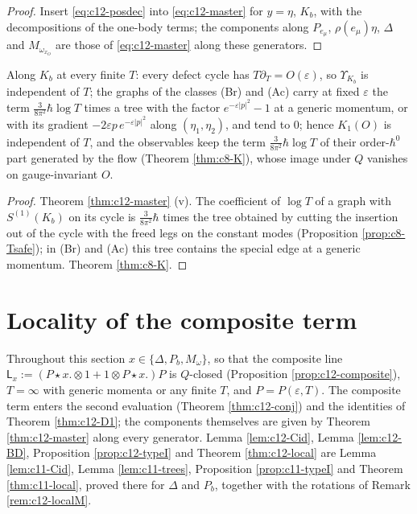\begin{proof}
Insert \eqref{eq:c12-posdec} into \eqref{eq:c12-master} for $y=\eta$, $K_b$, with the decompositions of the one-body terms; the components along $P_{e_\mu}$, $\rho(e_\mu)\eta$, $\Delta$ and $M_{\omega_{x_O}}$ are those of \eqref{eq:c12-master} along these generators.
\end{proof}

\begin{proposition}
\label{prop:c12-KT}
Along $K_b$ at every finite $T$: every defect cycle has $T\partial_T=O(\varepsilon)$, so $\Upsilon_{K_b}$ is independent of $T$; the graphs of the classes (Br) and (Ac) carry at fixed $\varepsilon$ the term $\tfrac3{8\pi^2}\hbar\log T$ times a tree with the factor $e^{-\varepsilon|p|^2}-1$ at a generic momentum, or with its gradient $-2\varepsilon p\,e^{-\varepsilon|p|^2}$ along $(\eta_1,\eta_2)$, and tend to $0$; hence $K_1(O)$ is independent of $T$, and the observables keep the term $\tfrac3{8\pi^2}\hbar\log T$ of their order-$\hbar^0$ part generated by the flow (Theorem \ref{thm:c8-K}), whose image under $Q$ vanishes on gauge-invariant $O$.
\end{proposition}

\begin{proof}
Theorem \ref{thm:c12-master} (v). The coefficient of $\log T$ of a graph with $S^{(1)}(K_b)$ on its cycle is $\tfrac3{8\pi^2}\hbar$ times the tree obtained by cutting the insertion out of the cycle with the freed legs on the constant modes (Proposition \ref{prop:c8-Tsafe}); in (Br) and (Ac) this tree contains the special edge at a generic momentum. Theorem \ref{thm:c8-K}.
\end{proof}

\section{Locality of the composite term}

Throughout this section $x\in\{\Delta,P_b,M_\omega\}$, so that the composite line $\mathsf L_x:=(P\star x.\otimes1+1\otimes P\star x.)P$ is $Q$-closed (Proposition \ref{prop:c12-composite}), $T=\infty$ with generic momenta or any finite $T$, and $P=P(\varepsilon,T)$. The composite term enters the second evaluation (Theorem \ref{thm:c12-conj}) and the identities of Theorem \ref{thm:c12-D1}; the components themselves are given by Theorem \ref{thm:c12-master} along every generator. Lemma \ref{lem:c12-Cid}, Lemma \ref{lem:c12-BD}, Proposition \ref{prop:c12-typeI} and Theorem \ref{thm:c12-local} are Lemma \ref{lem:c11-Cid}, Lemma \ref{lem:c11-trees}, Proposition \ref{prop:c11-typeI} and Theorem \ref{thm:c11-local}, proved there for $\Delta$ and $P_b$, together with the rotations of Remark \ref{rem:c12-localM}.

